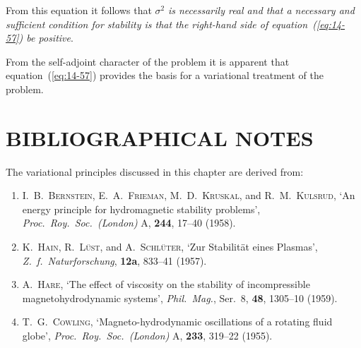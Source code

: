 From this equation it follows that $\sigma^2$ \emph{is necessarily real and that a necessary and sufficient condition for stability is that the right-hand side of equation~\emph{(\ref{eq:14-57})} be positive}.

From the self-adjoint character of the problem it is apparent that equation~(\ref{eq:14-57}) provides the basis for a variational treatment of the problem.

\section*{BIBLIOGRAPHICAL NOTES}

The variational principles discussed in this chapter are derived from:
\begin{enumerate}
\item I.~B.~\textsc{Bernstein}, E.~A.~\textsc{Frieman}, M.~D.~\textsc{Kruskal}, and R.~M.~\textsc{Kulsrud}, `An energy principle for hydromagnetic stability problems', \emph{Proc.\ Roy.\ Soc.\ (London)} A, \textbf{244}, 17--40 (1958). \cite{Bernstein1958}
\item K.~\textsc{Hain}, R.~\textsc{L\"ust}, and A.~\textsc{Schl\"uter}, `Zur Stabilit\"at eines Plasmas', \emph{Z.\ f.\ Naturforschung}, \textbf{12a}, 833--41 (1957). \cite{Hain1957}
\item A.~\textsc{Hare}, `The effect of viscosity on the stability of incompressible magnetohydrodynamic systems', \emph{Phil.\ Mag.}, Ser.~8, \textbf{48}, 1305--10 (1959). \cite{Hare1959}
\item T.~G.~\textsc{Cowling}, `Magneto-hydrodynamic oscillations of a rotating fluid globe', \emph{Proc.\ Roy.\ Soc.\ (London)} A, \textbf{233}, 319--22 (1955). \cite{Cowling1955}
\end{enumerate}

